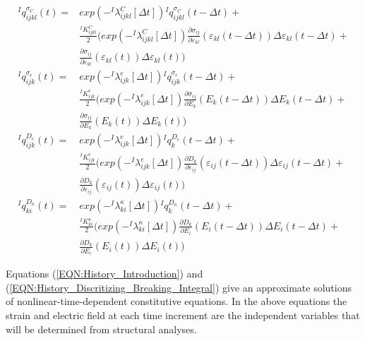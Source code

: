 \begin{equation}
\begin{aligned}
{}^{I}q_{ijkl}^{\sigma_C}(t)=&
exp(-{}^{I}\lambda_{ijkl}^{C}[\Delta t]){}^{I}q_{ijkl}^{\sigma_C}(t-\Delta t)+ \\
& \frac{{}^{I}K_{ijkl}^{C}}{2} \Big(exp(-{}^{I}\lambda_{ijkl}^{C}[\Delta t])\frac{\partial \sigma_{ij}}{\partial \varepsilon_{kl}}(\varepsilon_{kl}(t-\Delta t)) \Delta\varepsilon_{kl}(t-\Delta t) + \\
& \frac{\partial \sigma_{ij}}{\partial \varepsilon_{kl}}(\varepsilon_{kl}(t)) \Delta \varepsilon_{kl}(t) \Big) \\
{}^{I}q_{ijk}^{\sigma_e}(t)=&
 exp(-{}^{I}\lambda_{ijk}^{e}[\Delta t]) {}^{I}q_{ijk}^{\sigma_e}(t-\Delta t)+ \\
& \frac{{}^{I}K_{ijk}^{e}}{2} \Big( exp(-{}^{I}\lambda_{ijk}^{e}[\Delta t]) \frac{\partial \sigma_{ij}}{\partial E_{k}}(E_{k} (t-\Delta t )) \Delta E_{k} (t-\Delta t ) + \\
& \frac{\partial \sigma_{ij}}{\partial E_{k}} (E_{k} (t)) \Delta E_{k} (t) \Big)\\
{}^{I}q_{ijk}^{D_e}(t)=&
exp(-{}^{I}\lambda_{ijk}^{e}[\Delta t]){}^{I}q_{k}^{D_e}(t-\Delta t)+\\
& \frac{{}^{I}K_{ijk}^{e}}{2} \Big(exp(-{}^{I}\lambda_{ijk}^{e}[\Delta t]) \frac{\partial D_{k}}{\partial \varepsilon_{ij}}( \varepsilon_{ij}(t-\Delta t)) \Delta \varepsilon_{ij}(t-\Delta t) + \\
& \frac{\partial D_{k}}{\partial \varepsilon_{ij}}(\varepsilon_{ij}(t)) \Delta \varepsilon_{ij}(t)\Big) \\
{}^{I}q_{ki}^{D_{\kappa}}(t)=&
exp(-{}^{I}\lambda_{ki}^{\kappa}[\Delta t]){}^{I}q_{k}^{D_{\kappa}}(t-\Delta t)+\\
& \frac{{}^{I} K_{ki}^{\kappa}}{2} \Big( exp(-{}^{I}\lambda_{ki}^{\kappa}[\Delta t]) \frac{\partial D_{k}}{\partial E_{i}}( E_{i} (t-\Delta t)) \Delta E_{i} (t-\Delta t) + \\ 
& \frac{\partial D_{k}}{\partial E_{i}}( E_{i} (t)) \Delta E_{i} (t)\Big)
\end{aligned}
\label{EQN:History_Discritizing_Breaking_Integral}
\end{equation}

Equations (\ref{EQN:History_Introduction}) and (\ref{EQN:History_Discritizing_Breaking_Integral}) give an approximate solutions of nonlinear-time-dependent constitutive equations. 
In the above equations the strain and electric field at each time increment are the independent variables that will be determined from structural analyses.

